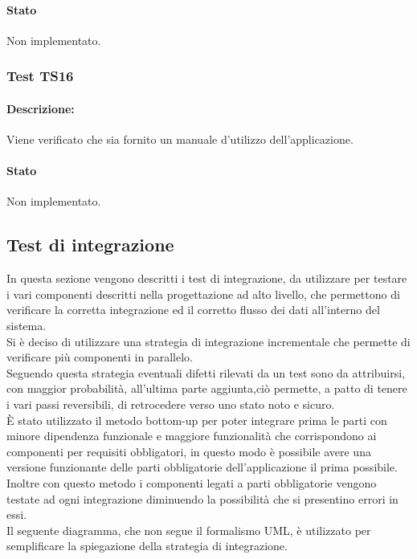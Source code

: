 \documentclass[../PianoDiQualifica.tex]{subfiles}
\begin{document}
	\paragraph{Stato} Non implementato.
	
	\subsubsection{Test TS16} 
	\paragraph{Descrizione:} Viene verificato che sia fornito un manuale d'utilizzo dell'applicazione.
	\paragraph{Stato} Non implementato.
	
	
	\subsection{Test di integrazione} 
	In questa sezione vengono descritti i test di integrazione, da utilizzare per testare i vari componenti descritti nella progettazione ad alto livello, che permettono di verificare la corretta integrazione ed il corretto flusso dei dati all'interno del sistema.\\	
	Si è deciso di utilizzare una strategia di integrazione incrementale che permette di verificare più componenti in parallelo.\\
	Seguendo questa strategia eventuali difetti rilevati da un test sono da attribuirsi, con maggior probabilità, all’ultima parte aggiunta,ciò permette, a patto di tenere i vari passi reversibili, di retrocedere verso uno stato noto e sicuro.\\
	È stato utilizzato il metodo bottom-up per poter integrare prima le parti con minore dipendenza funzionale e maggiore funzionalità che corrispondono ai componenti per requisiti obbligatori, in questo modo è possibile avere una versione funzionante delle parti obbligatorie dell’applicazione il prima possibile.\\
	Inoltre con questo metodo i componenti legati a parti obbligatorie vengono testate ad ogni integrazione diminuendo la possibilità che si presentino errori in essi.\\
	Il seguente diagramma, che non segue il formalismo UML, è utilizzato per semplificare la spiegazione della strategia di integrazione.
	
\end{document}

